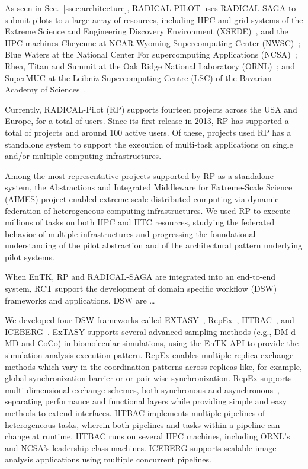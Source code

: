 \documentclass[preprint,12pt, a4paper]{elsarticle}
\begin{document}
As seen in Sec.~\ref{ssec:architecture}, RADICAL-PILOT uses RADICAL-SAGA to
submit pilots to a large array of resources, including HPC and grid systems
of the Extreme Science and Engineering Discovery Environment
(XSEDE)~\citep{towns2014xsede}, and the HPC machines Cheyenne at NCAR-Wyoming
Supercomputing Center (NWSC)~\citep{web-cheyenne}; Blue Waters at the
National Center For supercomputing Applications
(NCSA)~\citep{web-bluewaters}; Rhea, Titan and Summit at the Oak Ridge
National Laboratory (ORNL)~\citep{web-olcf-resources}; and SuperMUC at the
Leibniz Supercomputing Centre (LSC) of the Bavarian Academy of
Sciences~\citep{web-supermuc}.

Currently, RADICAL-Pilot (RP) supports fourteen projects across the USA and
Europe, for a total of  users. Since its first release
in 2013, RP has supported a total of  projects and
around 100 active users. Of these,  projects used RP
has a standalone system to support the execution of multi-task applications
on single and/or multiple computing infrastructures.

Among the most representative projects supported by RP as a standalone
system, the Abstractions and Integrated Middleware for Extreme-Scale Science
(AIMES) project enabled extreme-scale distributed computing via dynamic
federation of heterogeneous computing infrastructures. We used RP to execute
millions of tasks on both HPC and HTC resources, studying the federated
behavior of multiple infrastructures and progressing the foundational
understanding of the pilot abstraction and of the architectural pattern
underlying pilot systems.


When EnTK, RP and RADICAL-SAGA are integrated into an end-to-end system, RCT
support the development of domain specific workflow (DSW) frameworks and
applications. DSW are \ldots

We developed four DSW frameworks called
EXTASY~\cite{balasubramanian2016extasy}, RepEx~\cite{treikalis2016repex},
HTBAC~\cite{dakka2018high}, and ICEBERG~\cite{}. ExTASY supports several
advanced sampling methods (e.g., DM-d-MD and CoCo) in biomolecular
simulations, using the EnTK API to provide the simulation-analysis execution
pattern. RepEx enables multiple replica-exchange methods which vary in the
coordination patterns across replicas like, for example, global
synchronization barrier or or pair-wise synchronization. RepEx supports
multi-dimensional exchange schemes, both synchronous and
asynchronous~\cite{radak2015characterization}, separating performance and
functional layers while providing simple and easy methods to extend
interfaces. HTBAC implements multiple pipelines of heterogeneous tasks,
wherein both pipelines and tasks within a pipeline can change at runtime.
HTBAC runs on several HPC machines, including ORNL's and NCSA's
leadership-class machines. ICEBERG supports scalable image analysis
applications using multiple concurrent pipelines.
\end{document}
